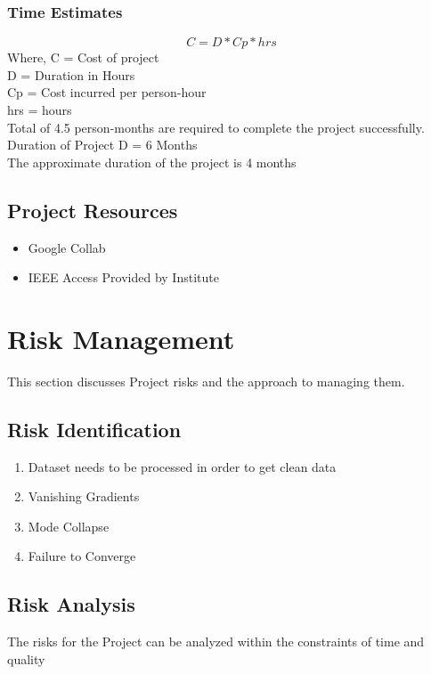 \documentclass[oneside,a4paper,12pt]{report}
\begin{document}
\subsubsection{Time Estimates}
\[C=D*Cp*hrs\]
Where, C = Cost of project\\
D = Duration in Hours\\
Cp = Cost incurred per person-hour\\
hrs = hours\\
Total of 4.5 person-months are required to complete the project successfully.\\
Duration of Project D = 6 Months\\
The approximate duration of the project is 4 months\\

\subsection{Project Resources}
\begin{itemize}
  \item Google Collab
  \item IEEE Access Provided by Institute
\end{itemize}

\section{Risk Management }
This section discusses Project risks and the approach to managing them.
\subsection{Risk Identification}
\begin{enumerate}
  \item Dataset needs to be processed in order to get clean data
  \item Vanishing Gradients
  \item Mode Collapse
  \item Failure to Converge
\end{enumerate}

\subsection{Risk Analysis}
The risks for the Project can be analyzed within the constraints of time and quality
\end{document}
